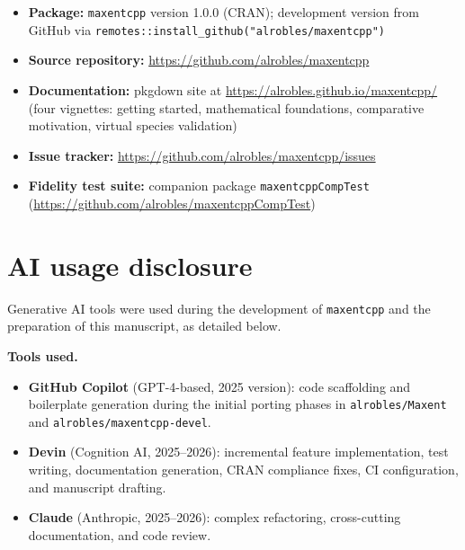 \documentclass[10pt,letterpaper]{article}
\providecommand{\tightlist}{%
  \setlength{\itemsep}{0pt}\setlength{\parskip}{0pt}}
\begin{document}
\begin{itemize}
\tightlist
\item
  \textbf{Package:} \texttt{maxentcpp} version 1.0.0 (CRAN); development
  version from GitHub via
  \texttt{remotes::install\_github("alrobles/maxentcpp")}
\item
  \textbf{Source repository:}
  \url{https://github.com/alrobles/maxentcpp}
\item
  \textbf{Documentation:} pkgdown site at
  \url{https://alrobles.github.io/maxentcpp/} (four vignettes: getting
  started, mathematical foundations, comparative motivation, virtual
  species validation)
\item
  \textbf{Issue tracker:}
  \url{https://github.com/alrobles/maxentcpp/issues}
\item
  \textbf{Fidelity test suite:} companion package
  \texttt{maxentcppCompTest}
  (\url{https://github.com/alrobles/maxentcppCompTest})
\end{itemize}

\section*{AI usage disclosure}

Generative AI tools were used during the development of
\texttt{maxentcpp} and the preparation of this manuscript, as detailed
below.

\textbf{Tools used.}

\begin{itemize}
\tightlist
\item
  \textbf{GitHub Copilot} (GPT-4-based, 2025 version): code scaffolding
  and boilerplate generation during the initial porting phases in
  \texttt{alrobles/Maxent} and \texttt{alrobles/maxentcpp-devel}.
\item
  \textbf{Devin} (Cognition AI, 2025--2026): incremental feature
  implementation, test writing, documentation generation, CRAN
  compliance fixes, CI configuration, and manuscript drafting.
\item
  \textbf{Claude} (Anthropic, 2025--2026): complex refactoring,
  cross-cutting documentation, and code review.
\end{itemize}
\end{document}
